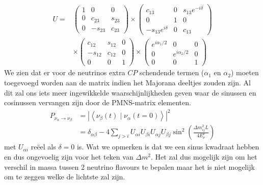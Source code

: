 \documentclass[../main.tex]{subfiles}
\begin{document}
\begin{equation}
    \begin{aligned}
        \label{eq:pmns_matrix_ontbonden}
        U =&\left(\begin{array}{ccc}
                1 & 0 & 0 \\
                0 & c_{23} & s_{23} \\
                0 & -s_{23} & c_{23}
                \end{array}\right) \times\left(\begin{array}{ccc}
                c_{13} & 0 & s_{13} e^{-i \delta} \\
                0 & 1 & 0 \\
                -s_{13} e^{i \delta} & 0 & c_{13}
        \end{array}\right) \\
        &\times\left(\begin{array}{ccc}
                c_{12} & s_{12} & 0 \\
                -s_{12} & c_{12} & 0 \\
                0 & 0 & 1
                \end{array}\right) \times\left(\begin{array}{ccc}
                e^{i \alpha_{1} / 2} & 0 & 0 \\
                0 & e^{i \alpha_{2} / 2} & 0 \\
                0 & 0 & 1
        \end{array}\right)
    \end{aligned}
\end{equation}
We zien dat er voor de neutrinos extra $CP$ schendende termen ($\alpha_1$ en $\alpha_2$) moeten toegevoegd worden aan de matrix indien het Majorana deeltjes zouden zijn. Al dit zal ons iets meer ingewikkelde waarschijnlijkheden geven waar de sinussen en cosinussen vervangen zijn door de PMNS-matrix elementen.
\begin{equation}
    \begin{aligned}
        \label{eq:neutrino_3_oscilaties_2}
        P_{\nu_{\alpha} \rightarrow \nu_{\beta}} &=\left|\left<\nu_{\beta}(t)\mid \nu_{\alpha}(t=0)\right>\right|^{2} \\
                                                 &=\delta_{\alpha \beta}-4 \sum_{j>i} U_{\alpha i} U_{\beta i} U_{\alpha j} U_{\beta j} \sin ^{2}\left(\frac{\Delta m_{i j}^{2} L}{4 E_{\nu}^{\nu}}\right)
    \end{aligned}
\end{equation}
met $U_{\alpha i}$ reëel als $\delta=0$ is. Wat we opmerken is dat we een sinus kwadraat hebben en dus ongevoelig zijn voor het teken van $\Delta m^2$. Het zal dus mogelijk zijn om het verschil in massa tussen 2 neutrino flavours te bepalen maar het is niet mogelijk om te zeggen welke de lichtste zal zijn.
\end{document}
